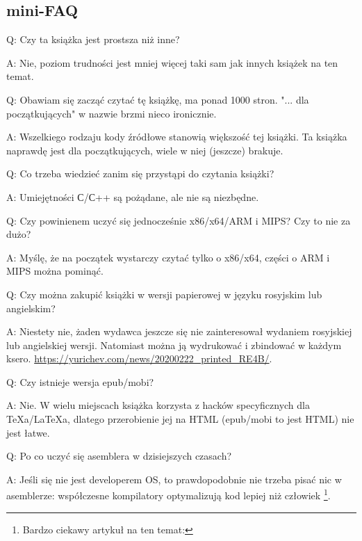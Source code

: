 \subsection*{mini-FAQ}

\par Q: Czy ta książka jest prostsza niż inne?
\par A: Nie, poziom trudności jest mniej więcej taki sam jak innych książek na ten temat.

\par Q: Obawiam się zacząć czytać tę książkę, ma ponad 1000 stron.
"... dla początkujących" w nazwie brzmi nieco ironicznie.
\par A: Wszelkiego rodzaju kody źródłowe stanowią większość tej książki.
Ta książka naprawdę jest dla początkujących, wiele w niej (jeszcze) brakuje.

\par Q: Co trzeba wiedzieć zanim się przystąpi do czytania książki?
\par A: Umiejętności С/С++ są pożądane, ale nie są niezbędne.

\par Q: Czy powinienem uczyć się jednocześnie x86/x64/ARM i MIPS? Czy to nie za dużo?
\par A: Myślę, że na początek wystarczy czytać tylko o x86/x64, części o ARM i MIPS można pominąć.

\par Q: Czy można zakupić książki w wersji papierowej w języku rosyjskim lub angielskim?
\par A: Niestety nie, żaden wydawca jeszcze się nie zainteresował wydaniem rosyjskiej lub angielskiej wersji. Natomiast można ją wydrukować i zbindować w każdym ksero.
\url{https://yurichev.com/news/20200222_printed_RE4B/}.

\par Q: Czy istnieje wersja epub/mobi?
\par A: Nie. W wielu miejscach książka korzysta z hacków specyficznych dla TeXa/LaTeXa, dlatego przerobienie jej na HTML
(epub/mobi to jest HTML) nie jest łatwe.

\par Q: Po co uczyć się asemblera w dzisiejszych czasach?
\par A: Jeśli się nie jest developerem \ac{OS}, to prawdopodobnie nie trzeba pisać nic w asemblerze: współczesne kompilatory optymalizują kod lepiej niż człowiek \footnote{Bardzo ciekawy artykuł na ten temat: \InSqBrackets{\AgnerFog}}.


